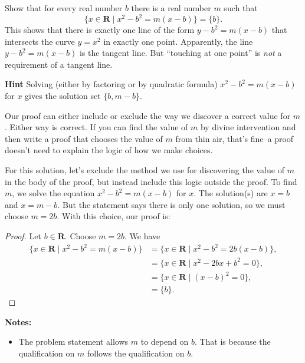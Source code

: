 \documentclass[12pt,fleqn,answers]{exam}
\newcommand{\reals}{\mathbf{R}}
\renewenvironment{solution}
  {\begin{shaded*}} %
  {\end{shaded*}}   %
\begin{document}
\begin{questions}
\question [10] Show that for every real number $b$ there is a real number $m$ such that
\begin{equation*}
 \{x \in \reals \mid x^2-b^2 = m (x-b) \} = \{b\}.
 \end{equation*}
 This shows that there is exactly one line of the form $y-b^2 = m (x-b)$ that intersects the curve $y=x^2$ in
 exactly one point. Apparently, the line  $y-b^2 = m (x-b)$ is the tangent line. But ``touching at one point'' is \emph{not}
 a requirement of a tangent line.

 \textbf{Hint} Solving (either by factoring or by quadratic formula) 
 $ x^2-b^2 = m (x-b)$ for $x$ gives the
 solution set $\{b,m-b\}$.

 \begin{solution} Our proof can either include or exclude the way we
  discover a correct value for $m$. Either way is correct.  If you can find the value of $m$
  by divine intervention and then write a proof that chooses the value
  of $m$ from thin air, that's fine--a proof doesn't need to explain
  the logic of how we make choices.

  \quad For this solution, let's exclude the method we use for discovering
  the value of $m$ in the body of the proof, but instead include this logic outside the 
  proof. To find $m$, we solve the equation $ x^2-b^2 = m (x-b)$ for $x$.
  The solution(s) are $x =b$ and $x = m-b$.  But the statement says 
  there is only one solution, so we must choose $m = 2 b$.
  With this choice, our proof is:

  \begin{proof} Let $b \in \reals$. Choose $m = 2 b$. We have
    \begin{align*}
      \{x \in \reals \mid x^2-b^2 = m (x-b) \} &= 
      \{x \in \reals \mid x^2-b^2 = 2 b (x-b) \}, \\
      &= \{x \in \reals \mid x^2 - 2 b x + b^2 = 0\},\\
      &= \{x \in \reals \mid (x-b)^2 = 0\},\\
      &= \{b\}.
      \end{align*}
    \end{proof}
\noindent \textbf{Notes:}

\begin{itemize}
\item The problem statement allows $m$ to depend on $b$. That is
because the qualification on $m$ follows the qualification on $b$.


\end{itemize}
\end{solution}
\end{questions}
\end{document}
